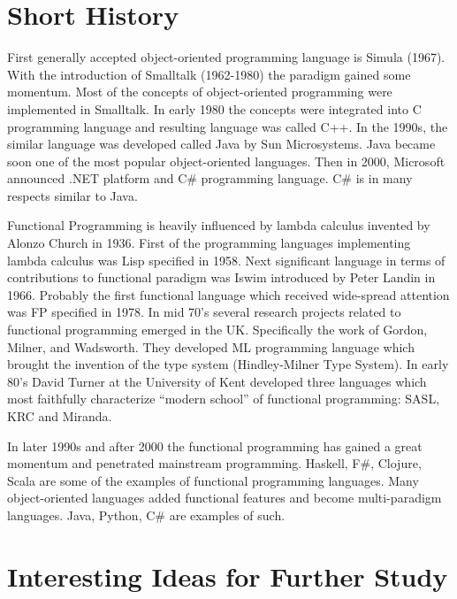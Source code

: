 \documentclass[12pt,twoside,a4paper]{report}
\begin{document}
\section{Short History}\label{2.4}
First generally accepted object-oriented programming language is Simula (1967). With the introduction of Smalltalk (1962-1980) the paradigm gained some momentum. Most of the concepts of object-oriented programming were implemented in Smalltalk. In early 1980 the concepts were integrated into C programming language and resulting language was called C++. In the 1990s, the similar language was developed called Java by Sun Microsystems. Java became soon one of the most popular object-oriented languages. Then in 2000, Microsoft announced .NET platform and C\# programming language. C\# is in many respects similar to Java. \cite{13}\par
Functional Programming is heavily influenced by lambda calculus invented by Alonzo Church in 1936. First of the programming languages implementing lambda calculus was Lisp specified in 1958. Next significant language in terms of contributions to functional paradigm was Iswim introduced by Peter Landin in 1966. Probably the first functional language which received wide-spread attention was FP specified in 1978. In mid 70’s several research projects related to functional programming emerged in the UK. Specifically the work of Gordon, Milner, and Wadsworth. They developed ML programming language which brought the invention of the type system (Hindley-Milner Type System). In early 80’s David Turner at the University of Kent developed three languages which most faithfully characterize “modern school” of functional programming: SASL, KRC and Miranda. \cite{12}\par
In later 1990s and after 2000 the functional programming has gained a great momentum and penetrated mainstream programming. Haskell, F\#, Clojure, Scala are some of the examples of functional programming languages. Many object-oriented languages added functional features and become multi-paradigm languages. Java, Python, C\# are examples of such.

\section{Interesting Ideas for Further Study}\label{2.5}
\end{document}
